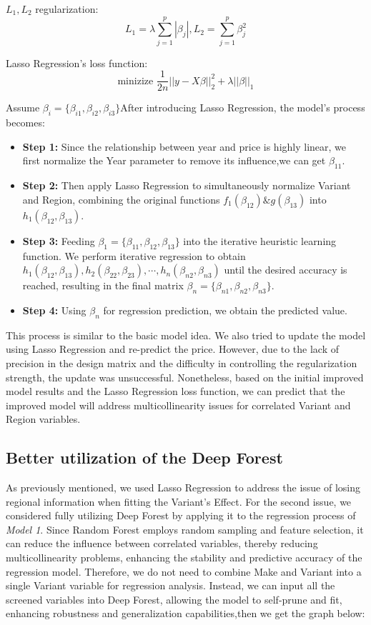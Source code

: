 \documentclass[12pt]{article}  %
\begin{document}
$L_1,L_2$ regularization:
$$L_1=\lambda\sum_{j=1}^{p}|\beta_j|,L_2=\sum_{j=1}^{p}\beta_j^2$$

Lasso Regression's loss function:
$$\text{minizize }\frac{1}{2n}||y-X\beta||_2^2+\lambda||\beta||_1$$

Assume $\beta_i=\{\beta_{i1},\beta_{i2},\beta_{i3}\}$After introducing Lasso Regression, the model's process becomes:
\begin{itemize}
    \item \textbf{Step 1:} Since the relationship between year and price is highly linear, we first normalize the Year parameter to remove its influence,we can get $\beta_{11}$.
    \item \textbf{Step 2:} Then apply Lasso Regression to simultaneously normalize Variant and Region, combining the original functions $f_1(\beta_{12})\&g(\beta_{13})$ into $h_1(\beta_{12},\beta_{13})$.
    \item \textbf{Step 3:} Feeding $\beta_1=\{\beta_{11},\beta_{12},\beta_{13}\}$ into the iterative heuristic learning function. We perform iterative regression to obtain $h_1(\beta_{12},\beta_{13}),h_2(\beta_{22},\beta_{23}),\cdots,h_n(\beta_{n2},\beta_{n3})$ until the desired accuracy is reached, resulting in the final matrix $\beta_n=\{\beta_{n1},\beta_{n2},\beta_{n3}\}$.
    \item \textbf{Step 4:} Using $\beta_n$ for regression prediction, we obtain the predicted value.
\end{itemize}

This process is similar to the basic model idea. We also tried to update the model using Lasso Regression and re-predict the price. However, due to the lack of precision in the design matrix and the difficulty in controlling the regularization strength, the update was unsuccessful. Nonetheless, based on the initial improved model results and the Lasso Regression loss function, we can predict that the improved model will address multicollinearity issues for correlated Variant and Region variables.

\subsection{Better utilization of the Deep Forest}
As previously mentioned, we used Lasso Regression to address the issue of losing regional information when fitting the Variant's Effect. For the second issue, we considered fully utilizing Deep Forest by applying it to the regression process of \emph{Model 1}. Since Random Forest employs random sampling and feature selection, it can reduce the influence between correlated variables, thereby reducing multicollinearity problems, enhancing the stability and predictive accuracy of the regression model. Therefore, we do not need to combine Make and Variant into a single Variant variable for regression analysis. Instead, we can input all the screened variables into Deep Forest, allowing the model to self-prune and fit, enhancing robustness and generalization capabilities,then we get the graph below:
\end{document}

